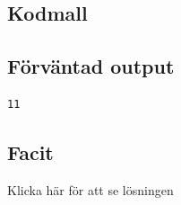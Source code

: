 \hypertarget{kodmall}{%
\subsection{Kodmall}\label{kodmall}}

\hypertarget{cb1}{}
\begin{Shaded}
\begin{Highlighting}[]
   \OperatorTok{(}\OperatorTok{[]}\OperatorTok{)} \OperatorTok{\{}
\OperatorTok{\}}
\OperatorTok{[]}\OperatorTok{=} \OperatorTok{\{} \OperatorTok{,} \OperatorTok{,} \OperatorTok{,} \OperatorTok{,}  \OperatorTok{\};}
\OperatorTok{=} \OperatorTok{(}\OperatorTok{);}
\OperatorTok{(}\OperatorTok{);}
\end{Highlighting}
\end{Shaded}

\hypertarget{fuxf6rvuxe4ntad-output}{%
\subsection{Förväntad output}\label{fuxf6rvuxe4ntad-output}}

\begin{verbatim}
11
\end{verbatim}

\hypertarget{facit}{%
\subsection{Facit}\label{facit}}

Klicka här för att se lösningen

\hypertarget{cb3}{}
\begin{Shaded}
\begin{Highlighting}[]
\OperatorTok{=}\OperatorTok{[}\OperatorTok{];}
 \OperatorTok{(}\OperatorTok{=} \OperatorTok{;}\OperatorTok{\textless{}}\OperatorTok{;}\OperatorTok{++)} \OperatorTok{\{}
     \OperatorTok{(}\OperatorTok{[}\OperatorTok{]} \OperatorTok{\textgreater{}}\OperatorTok{)} \OperatorTok{\{}
\OperatorTok{=}\OperatorTok{[}\OperatorTok{];}
    \OperatorTok{\}}
\OperatorTok{\}}
\OperatorTok{;}
\end{Highlighting}
\end{Shaded}

